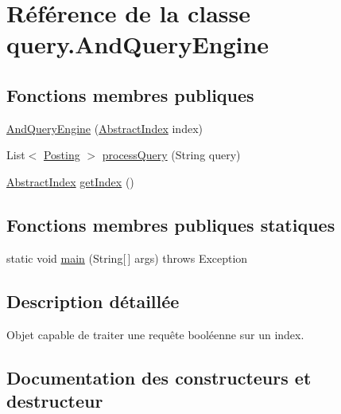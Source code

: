 \hypertarget{classquery_1_1AndQueryEngine}{}\section{Référence de la classe query.\+And\+Query\+Engine}
\label{classquery_1_1AndQueryEngine}
\subsection*{Fonctions membres publiques}
\begin{DoxyCompactItemize}
\item 
\hyperlink{classquery_1_1AndQueryEngine_a93d427a9690250f1ab77b9b821420c37}{And\+Query\+Engine} (\hyperlink{classindexation_1_1AbstractIndex}{Abstract\+Index} index)
\item 
List$<$ \hyperlink{classindexation_1_1content_1_1Posting}{Posting} $>$ \hyperlink{classquery_1_1AndQueryEngine_a41f8316a47cc313b95839959ec4de38a}{process\+Query} (String query)
\item 
\hyperlink{classindexation_1_1AbstractIndex}{Abstract\+Index} \hyperlink{classquery_1_1AndQueryEngine_a1ed58d50e47acd0e0aa5fae1cb91668c}{get\+Index} ()
\end{DoxyCompactItemize}
\subsection*{Fonctions membres publiques statiques}
\begin{DoxyCompactItemize}
\item 
static void \hyperlink{classquery_1_1AndQueryEngine_a3a269d6715d08630d6324c5488461225}{main} (String\mbox{[}$\,$\mbox{]} args)  throws Exception  	
\end{DoxyCompactItemize}


\subsection{Description détaillée}
Objet capable de traiter une requête booléenne sur un index. 

\subsection{Documentation des constructeurs et destructeur}
\mbox{\label{classquery_1_1AndQueryEngine_a93d427a9690250f1ab77b9b821420c37}} 
